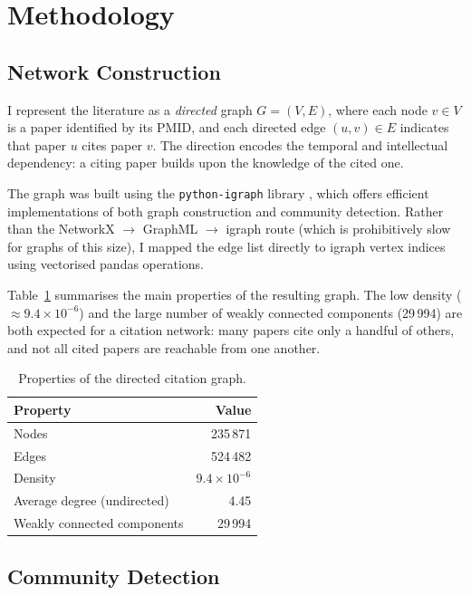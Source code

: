 \documentclass[12pt,a4paper]{article}
\begin{document}
\section{Methodology}

\subsection{Network Construction}

I represent the literature as a \textit{directed} graph $G = (V, E)$, where each node
$v \in V$ is a paper identified by its PMID, and each directed edge $(u, v) \in E$
indicates that paper $u$ cites paper $v$.
The direction encodes the temporal and intellectual dependency: a citing paper builds
upon the knowledge of the cited one.

The graph was built using the \texttt{python-igraph} library \cite{igraph2006}, which
offers efficient implementations of both graph construction and community detection.
Rather than the NetworkX $\to$ GraphML $\to$ igraph route (which is prohibitively slow
for graphs of this size), I mapped the edge list directly to igraph vertex indices using
vectorised pandas operations.

Table~\ref{tab:graph} summarises the main properties of the resulting graph.
The low density ($\approx 9.4 \times 10^{-6}$) and the large number of weakly connected
components (29\,994) are both expected for a citation network: many papers cite only a
handful of others, and not all cited papers are reachable from one another.

\begin{table}[H]
\centering
\caption{Properties of the directed citation graph.}
\begin{tabular}{lr}
\toprule
\textbf{Property} & \textbf{Value} \\
\midrule
Nodes                         & 235\,871 \\
Edges                         & 524\,482 \\
Density                       & $9.4 \times 10^{-6}$ \\
Average degree (undirected)   & 4.45 \\
Weakly connected components   & 29\,994 \\
\bottomrule
\end{tabular}
\label{tab:graph}
\end{table}

\subsection{Community Detection}
\end{document}
